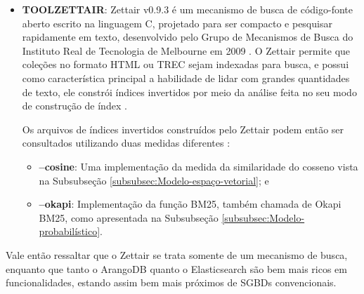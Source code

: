 \begin{itemize}
        Utiliza da linguagem de consulta AQL (\textit{ArangoDB Query Language}) para recuperar e modificar dados, que, por meio das \textit{views}\footnote{``Uma \textit{view} (visão) em terminologia SQL é uma única tabela que é derivada de outras tabelas [$\cdots$]  é considerada uma tabela virtual'' \cite[p.~88]{ElmasriSBD2010}. } do tipo arangosearch, introduz uma camada de integração com a biblioteca IResearch\footnote{Biblioteca de mecanismo de busca orientada a documentos, multiplataforma, e de alto desempenho, escrita inteiramente em C++, com o foco em uma conectividade de diferentes modelos de ranqueamento/similaridade \cite{IRESEARCH_GITHUB_2019}.}.
        Assim, por meio da AQL integrada ao IResearch, o ArangoDB fornece funções de ordenação de documentos mediante uma consulta, e, dentre elas, a função BM25() faz uma implementação do algoritmo da função de ranqueamento BM25 \cite{ARANGODB_SEARCHVIEWS_2019}.
        
        \item \textbf{TOOL\underscore{}ZETTAIR}: Zettair v0.9.3 é um mecanismo de busca de código-fonte aberto escrito na linguagem C, projetado para ser compacto e pesquisar rapidamente em texto, desenvolvido pelo Grupo de Mecanismos de Busca do Instituto Real de Tecnologia de Melbourne em 2009 \cite{ZETTAIR_HOME_2009}.
        O Zettair permite que coleções no formato HTML ou TREC sejam indexadas para busca, e possui como característica principal a habilidade de lidar com grandes quantidades de texto, ele constrói índices invertidos por meio da análise feita no seu modo de construção de índex \cite{ZETTAIR_INDEX_2009}.
        
        Os arquivos de índices invertidos construídos pelo Zettair podem então ser consultados utilizando duas medidas diferentes \cite{ZETTAIR_USAGE_2009}:
        \begin{itemize}
            \item \textbf{--cosine}: Uma implementação da medida da similaridade do cosseno vista na Subsubseção \ref{subsubsec:Modelo-espaço-vetorial}; e
            
            \item \textbf{--okapi}: Implementação da função BM25, também chamada de Okapi BM25, como apresentada na Subsubseção \ref{subsubsec:Modelo-probabilístico}.
        \end{itemize}
        
    \end{itemize}
    Vale então ressaltar que o Zettair se trata somente de um mecanismo de busca, enquanto que tanto o ArangoDB quanto o Elasticsearch são bem mais ricos em funcionalidades, estando assim bem mais próximos de SGBDs convencionais.
    

